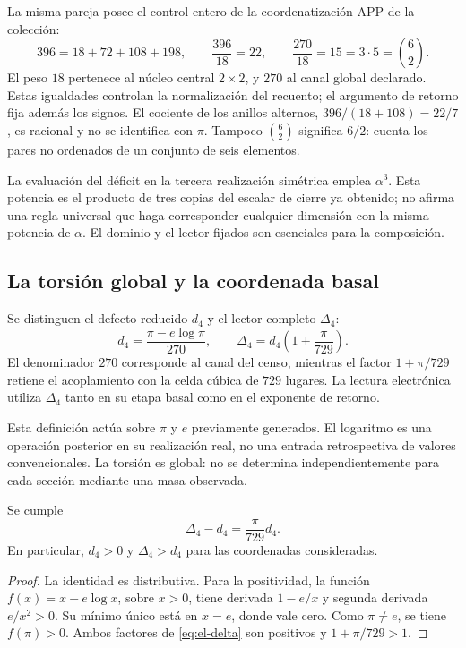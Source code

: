 La misma pareja posee el control entero de la coordenatización APP de la colección:
\begin{equation}
 396=18+72+108+198,
 \qquad \frac{396}{18}=22,
 \qquad \frac{270}{18}=15=3\cdot5=\binom62.
 \label{eq:el-censo}
\end{equation}
El peso \(18\) pertenece al núcleo central \(2\times2\), y \(270\)
al canal global declarado. Estas igualdades controlan la normalización
del recuento; el argumento de retorno fija además los signos. El
cociente de los anillos alternos,
\(396/(18+108)=22/7\), es racional y no se identifica con \(\pi\).
Tampoco \(\binom62\) significa \(6/2\): cuenta los pares no ordenados
de un conjunto de seis elementos.

La evaluación del déficit en la tercera realización simétrica emplea
\(\alpha^3\). Esta potencia es el producto de tres copias del escalar
de cierre ya obtenido; no afirma una regla universal que haga
corresponder cualquier dimensión con la misma potencia de \(\alpha\).
El dominio y el lector fijados son esenciales para la composición.

\subsection{La torsión global y la coordenada basal}

\begin{definition}
Se distinguen el defecto reducido \(d_4\) y el lector completo
\(\Delta_4\):
\begin{equation}
 d_4=\frac{\pi-e\log\pi}{270},\qquad
 \Delta_4=d_4\left(1+\frac{\pi}{729}\right).
 \label{eq:el-delta}
\end{equation}
El denominador \(270\) corresponde al canal del censo, mientras el
factor \(1+\pi/729\) retiene el acoplamiento con la celda cúbica de
\(729\) lugares. La lectura electrónica utiliza \(\Delta_4\) tanto en
su etapa basal como en el exponente de retorno.
\end{definition}

Esta definición actúa sobre \(\pi\) y \(e\) previamente generados. El
logaritmo es una operación posterior en su realización real, no una
entrada retrospectiva de valores convencionales. La torsión es global:
no se determina independientemente para cada sección mediante una masa
observada.

\begin{lemma}
Se cumple
\begin{equation}
 \Delta_4-d_4=\frac{\pi}{729}d_4.
 \label{eq:el-delta-diferencia}
\end{equation}
En particular, \(d_4>0\) y \(\Delta_4>d_4\) para las coordenadas
consideradas.
\end{lemma}
\begin{proof}
La identidad es distributiva. Para la positividad, la función
\(f(x)=x-e\log x\), sobre \(x>0\), tiene derivada \(1-e/x\) y
segunda derivada \(e/x^2>0\). Su mínimo único está en \(x=e\), donde
vale cero. Como \(\pi\ne e\), se tiene \(f(\pi)>0\). Ambos factores
de \eqref{eq:el-delta} son positivos y \(1+\pi/729>1\).
\end{proof}


